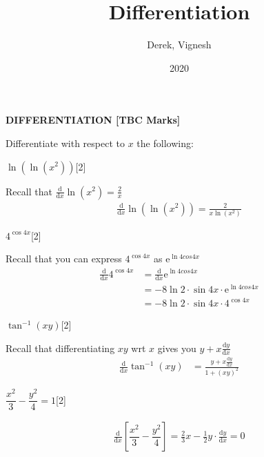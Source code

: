 \documentclass[12pt, a4 paper]{article}
\title{Differentiation}
\author{Derek, Vignesh}
\date{2020}
\begin{document}
\maketitle

\textbf{DIFFERENTIATION [TBC Marks]}
\begin{outline}[enumerate]

 \1 Differentiate with respect to $x$ the following: %

 \2 $\ln (\ln ({x^2}))$\hfill[2]
 \begin{answer}
  Recall that $\frac{\mathrm{d}}{\mathrm{d}x}\ln(x^2)=\frac{2}{x}$
  \begin{align*}
   \frac{\mathrm{d}}{\mathrm{d}x}\ln (\ln ({x^2})) = \frac{2}{x\ln ({x^2})}
  \end{align*}
 \end{answer}

 \2 $4^{\cos 4x}$\hfill[2]
 \begin{answer}
  Recall that you can express $4^{\cos4x}$ as $\mathrm{e}^{\ln4cos4x}$
  \begin{align*}
   \frac{\mathrm{d}}{\mathrm{d}x}4^{\cos 4x} & =\frac{\mathrm{d}}{\mathrm{d}x}\mathrm{e}^{\ln4cos4x} \\
                                             & = -8\ln2 \cdot \sin4x \cdot \mathrm{e}^{\ln4cos4x}    \\
                                             & = -8\ln2 \cdot \sin4x \cdot 4^{\cos4x}
  \end{align*}
 \end{answer}

 \2 $\tan ^{ - 1}(xy)$\hfill[2]
 \begin{answer}
  Recall that differentiating $xy$ wrt $x$ gives you $y+x\frac{\mathrm{d}y}{\mathrm{d}x}$
  \begin{align*}
   \frac{\mathrm{d}}{\mathrm{d}x}\tan ^{ - 1}(xy) & = \frac{y+x\frac{\mathrm{d}y}{\mathrm{d}x}}{1+(xy)^2}
  \end{align*}
 \end{answer}

 \2 $\dfrac{{{x^2}}}{3} - \dfrac{{{y^2}}}{4} = 1$\hfill[2]
 \begin{answer}
  \begin{align*}
   \frac{\mathrm{d}}{\mathrm{d}x}\left[\dfrac{{{x^2}}}{3} - \dfrac{{{y^2}}}{4}\right] = \frac{2}{3}x-\frac{1}{2}y\cdot\frac{\mathrm{d}y}{\mathrm{d}x} = 0
  \end{align*}
 \end{answer}


\end{outline}
\end{document}
